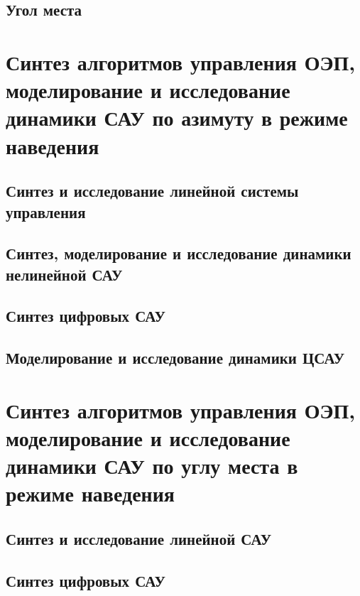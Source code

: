 
\clearpage





\subsection{Угол места} \label{ch:ch4/sect4-/sub2}

\section{Синтез алгоритмов управления ОЭП, моделирование и исследование динамики САУ по азимуту в режиме наведения} \label{ch:ch4/sect4}


\subsection{Синтез и исследование линейной системы управления} \label{subsec:ch4/sect4/sub1}


\subsection{Синтез, моделирование и исследование динамики нелинейной САУ} \label{subsec:ch4/sect4/sub2}


\subsection{Синтез цифровых САУ } \label{subsec:ch4/sect4/sub3}


\subsection{Моделирование и исследование динамики ЦСАУ} \label{subsec:ch4/sect4/sub4}


\section{Синтез алгоритмов управления ОЭП, моделирование и исследование динамики САУ  по углу места  в режиме наведения} \label{ch:ch4/sect5}


\subsection{Синтез и исследование линейной САУ} \label{subsec:ch4/sect5/sub1}


\subsection{Синтез цифровых САУ } \label{subsec:ch4/sect5/sub2}


